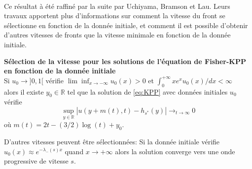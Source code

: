 \documentclass[11pt]{article}
\begin{document}
\paragraph{}
Ce résultat à été raffiné par la suite par Uchiyama, Bramson et Lau. Leurs travaux apportent plus d'informations sur comment la vitesse du front se sélectionne en fonction de la donnée initiale, et comment il est possible d'obtenir d'autres vitesses de fronts que la vitesse minimale en fonction de la donnée initiale.
\begin{theorem}{\textbf{Sélection de la vitesse pour les solutions de l'équation de Fisher-KPP en fonction de la donnée initiale}}\\
Si $u_0 \to ]0,1[$ vérifie $\lim\inf_{x\to -\infty} u_0(x) > 0$ et $\int_0^{+\infty} xe^xu_0(x) / dx < \infty$\\
alors il existe $y_0 \in \mathbb{R}$ tel que la solution de \eqref{eq:KPP} avec données initiales $u_0$ vérifie
\begin{equation*}
\sup_{y \in \mathbb{R}}  |u(y+m(t),t)-h_{s^*}(y)| \to_{t\to \infty} 0
\end{equation*}
où $m(t)= 2t - (3/2)\log (t) + y_0 $. 
\end{theorem}
D'autres vitesses peuvent être sélectionnées: Si la donnée initiale vérifie $u_0(x) \approx  e^{-\lambda_-(s)x}$ quand $x \to +\infty$ alors la solution converge vers une onde progressive de vitesse $s$.





\newpage
\end{document}
